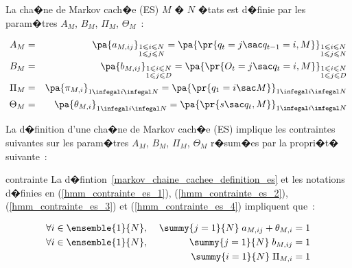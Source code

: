 La cha�ne de Markov cach�e (ES) $M$ � $N$ �tats est d�finie par les param�tres $A_M$, $B_M$, $\Pi_M$, $\Theta_M$~:

        \begin{eqnarray}
        A_M    &=& \pa {  a_{M,ij} } _ {\substack{ 1\leqslant i\leqslant N\\1\leqslant j\leqslant N}} =
                   \pa{ \pr {  q_{t}=j \sac  q_{t-1} =i,M } } _{\substack{1\leqslant i\leqslant N\\
                                                                               1\leqslant j\leqslant N}} \label{hmm_contrainte_es_1}\\
        B_M    &=& \pa{   b_{M,ij} } _ {\substack{1\leqslant i\leqslant N\\1\leqslant j\leqslant D}}=
                   \pa { \pr{ O_{t}=j \sac  q_{t}=i,M } }     _ {\substack{1\leqslant i\leqslant N
                                                                               \\1\leqslant j\leqslant D}} \label{hmm_contrainte_es_2}\\
        \Pi_M  &=& \pa { \pi_{M,i} } _ { 1 \infegal i \infegal N } = \pa { \pr {  q_1 = i \sac M} } _ 
                                                                        { 1 \infegal i \infegal N } \label{hmm_contrainte_es_3} \\
        \Theta_M  &=& \pa { \theta_{M,i} } _ { 1 \infegal i \infegal N } = \pa { \pr {  s \sac q_{t}, M} } _ 
                                                                                { 1 \infegal i \infegal N } \label{hmm_contrainte_es_4}
        \end{eqnarray}


La d�finition d'une cha�ne de Markov cach�e (ES) implique les contraintes suivantes sur les param�tres $A_M$, $B_M$, $\Pi_M$, $\Theta_M$
r�sum�es par la propri�t� suivante~:


        \begin{xproperty}{contrainte}
        \label{propriete_mmc_contrainte_es}%
        La d�fintion~\ref{markov_chaine_cachee_definition_es} et les notations d�finies en (\ref{hmm_contrainte_es_1}),
        (\ref{hmm_contrainte_es_2}), (\ref{hmm_contrainte_es_3}) et (\ref{hmm_contrainte_es_4}) impliquent que~:
        
                \begin{eqnarray}
                \forall i\in \ensemble{1}{N}, \; && \summy{j=1}{N} \; a_{M,ij} + \theta_{M,i} =1 \\
                \forall i\in \ensemble{1}{N}, \; &&\summy{j=1}{N} \; b_{M,ij}=1 \\
                                                 &&\summy{i=1}{N} \; \Pi_{M,i} = 1
                \end{eqnarray}
        \end{xproperty}
        
